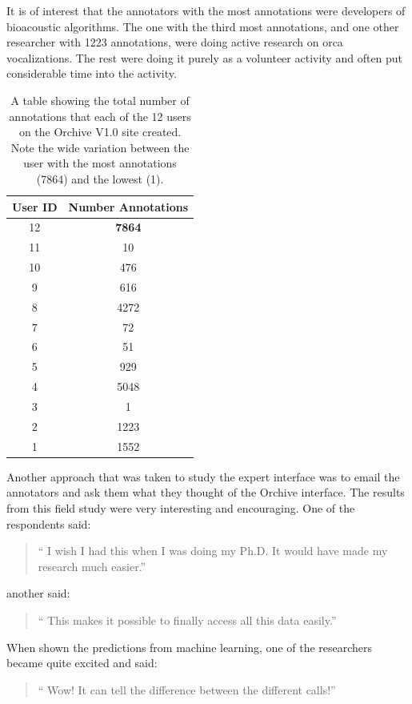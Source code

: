 \documentclass[12pt,oneside]{book}
\begin{document}
It is of interest that the annotators with the most annotations were
developers of bioacoustic algorithms.  The one with the third most
annotations, and one other researcher with 1223 annotations, were
doing active research on orca vocalizations.  The rest were doing it
purely as a volunteer activity and often put considerable time into
the activity.

\begin{table}
\begin{tabular}{|c|c|}
\hline
User ID & Number Annotations \\
\hline
12  & \textbf{7864} \\
11  & 10 \\
10  & 476 \\
9  &  616 \\
8  &  4272 \\
7  &  72 \\
6  &  51 \\
5  &  929 \\
4  &  5048 \\
3  &  1 \\
2  &  1223 \\
1  &  1552 \\
\hline
\end{tabular}
\caption{A table showing the total number of annotations that each of
  the 12 users on the Orchive V1.0 site created.  Note the wide
  variation between the user with the most annotations (7864) and the
  lowest (1).}
\label{table:expert-annotations}
\end{table}

Another approach that was taken to study the expert interface was to
email the annotators and ask them what they thought of the Orchive
interface.  The results from this field study were very interesting
and encouraging.  One of the respondents said:

\begin{quote}
`` I wish I had this when I was doing my Ph.D.  It would have made my
  research much easier.''
\end{quote}

another said:

\begin{quote}
`` This makes it possible to finally access all this data easily.''
\end{quote}

When shown the predictions from machine learning, one of the
researchers became quite excited and said:

\begin{quote}
`` Wow!  It can tell the difference between the different calls!''
\end{quote}
\end{document}

